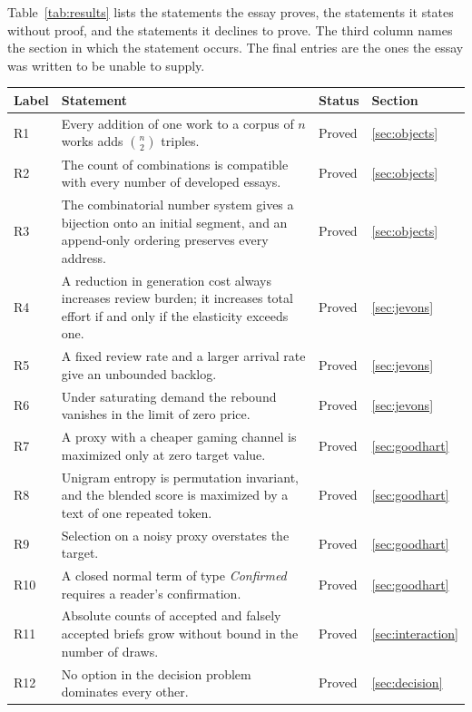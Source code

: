 \documentclass[11pt]{article}
\theoremstyle{plain}
\theoremstyle{definition}
\theoremstyle{remark}
\begin{document}
Table~\ref{tab:results} lists the statements the essay proves, the statements it states without proof, and the statements it declines to prove. The third column names the section in which the statement occurs. The final entries are the ones the essay was written to be unable to supply.

\begin{table}[ht]
\centering
\small
\begin{tabular}{@{}p{}p{}p{}p{}@{}}
\toprule
Label & Statement & Status & Section \\
\midrule
R1 & Every addition of one work to a corpus of $n$ works adds $\binom{n}{2}$ triples. & Proved & \ref{sec:objects} \\
R2 & The count of combinations is compatible with every number of developed essays. & Proved & \ref{sec:objects} \\
R3 & The combinatorial number system gives a bijection onto an initial segment, and an append-only ordering preserves every address. & Proved & \ref{sec:objects} \\
R4 & A reduction in generation cost always increases review burden; it increases total effort if and only if the elasticity exceeds one. & Proved & \ref{sec:jevons} \\
R5 & A fixed review rate and a larger arrival rate give an unbounded backlog. & Proved & \ref{sec:jevons} \\
R6 & Under saturating demand the rebound vanishes in the limit of zero price. & Proved & \ref{sec:jevons} \\
R7 & A proxy with a cheaper gaming channel is maximized only at zero target value. & Proved & \ref{sec:goodhart} \\
R8 & Unigram entropy is permutation invariant, and the blended score is maximized by a text of one repeated token. & Proved & \ref{sec:goodhart} \\
R9 & Selection on a noisy proxy overstates the target. & Proved & \ref{sec:goodhart} \\
R10 & A closed normal term of type \emph{Confirmed} requires a reader's confirmation. & Proved & \ref{sec:goodhart} \\
R11 & Absolute counts of accepted and falsely accepted briefs grow without bound in the number of draws. & Proved & \ref{sec:interaction} \\
R12 & No option in the decision problem dominates every other. & Proved & \ref{sec:decision} \\

\end{tabular}
\end{table}
\end{document}
